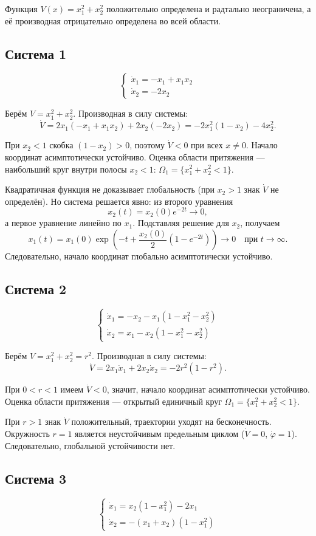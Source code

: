 \documentclass[12pt,a4paper]{article}
\begin{document}
Функция $V(x)=x_1^2+x_2^2$ положительно определена и радтально неограничена, а её производная отрицательно определена во всей области.
	
\subsection{Система 1}
\[
\begin{cases} 
	\dot x_1=-x_1+x_1x_2 \\ 
	\dot x_2=-2x_2 
\end{cases}
\]

Берём $V=x_1^2+x_2^2$. Производная в силу системы:
\[
\dot V = 2x_1(-x_1+x_1x_2)+2x_2(-2x_2) = -2x_1^2(1-x_2)-4x_2^2.
\]

При $x_2<1$ скобка $(1-x_2)>0$, поэтому $\dot V<0$ при всех $x\neq0$. Начало координат асимптотически устойчиво. Оценка области притяжения — наибольший круг внутри полосы $x_2<1$: $\Omega_1=\{x_1^2+x_2^2<1\}$.

Квадратичная функция не доказывает глобальность (при $x_2>1$ знак $\dot V$ не определён). 
Но система решается явно: из второго уравнения
\[
x_2(t)=x_2(0)e^{-2t}\to0,
\]
а первое уравнение линейно по $x_1$. Подставляя решение для $x_2$, получаем
\[
x_1(t)=x_1(0)\exp\!\left(-t+\frac{x_2(0)}{2}(1-e^{-2t})\right)\to0 \quad \text{при } t\to\infty.
\]
Следовательно, начало координат глобально асимптотически устойчиво.
	
\subsection{Система 2}
\[
\begin{cases} 
	\dot x_1=-x_2-x_1(1-x_1^2-x_2^2) \\ 
	\dot x_2=x_1-x_2(1-x_1^2-x_2^2)
\end{cases}
\]

Берём $V=x_1^2+x_2^2=r^2$. Производная в силу системы:
\[
\dot V = 2x_1\dot x_1+2x_2\dot x_2 = -2r^2(1-r^2).
\]

При $0<r<1$ имеем $\dot V<0$, значит, начало координат асимптотически устойчиво. Оценка области притяжения — открытый единичный круг $\Omega_1=\{x_1^2+x_2^2<1\}$.

При $r>1$ знак $\dot V$ положительный, траектории уходят на бесконечность. Окружность $r=1$ является неустойчивым предельным циклом ($\dot V=0$, $\dot\varphi=1$). Следовательно, глобальной устойчивости нет.
	
\subsection{Система 3}
\[
\begin{cases} 
	\dot x_1=x_2(1-x_1^2)-2x_1 \\ 
	\dot x_2=-(x_1+x_2)(1-x_1^2)
\end{cases}
\]
\end{document}
